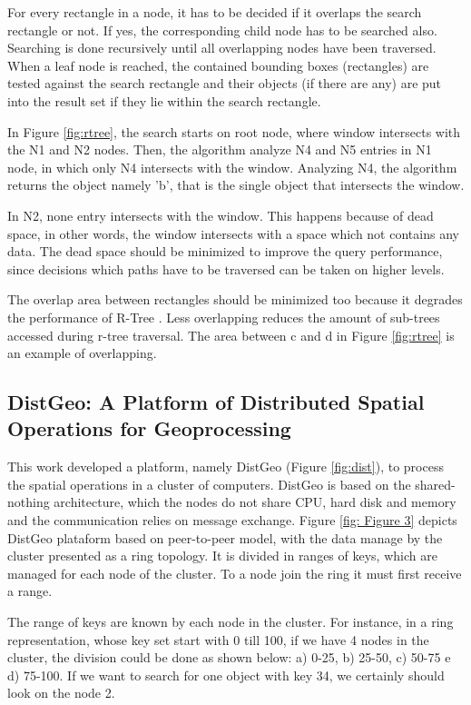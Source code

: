 For every rectangle in a node, it has to be decided if it overlaps the search rectangle or not. If yes, the corresponding child node has to be searched also. 
Searching is done recursively until all overlapping nodes have been traversed. When a leaf node is reached, the contained bounding boxes (rectangles) are tested against the search rectangle 
and their objects (if there are any) are put into the result set if they lie within the search rectangle.

In Figure \ref{fig:rtree}, the search starts on root node, where window intersects with the N1 and N2 nodes. Then, the algorithm analyze N4 and N5 entries in N1 node, in which only N4 intersects with the window. 
Analyzing N4, the algorithm returns the object namely 'b', that is the single object that intersects the window.

In N2, none entry intersects with the window. This happens because of dead space, in other words, the window intersects with a space which not contains any data. 
The dead space should be minimized to improve the query performance, since decisions which paths have to be traversed can be taken on higher levels. 

The overlap area between rectangles should be minimized too because it degrades the performance of R-Tree \cite{beckmann1990r}. 
Less overlapping reduces the amount of sub-trees accessed during r-tree traversal. The area between c and d in Figure \ref{fig:rtree} is an example of overlapping.

\subsection{DistGeo: A Platform of Distributed Spatial Operations for Geoprocessing}

This work developed a platform, namely DistGeo (Figure \ref{fig:dist}), to process the spatial operations in a cluster of computers. 
DistGeo is based on the shared-nothing architecture, which the nodes do not share CPU, hard disk and memory and the communication relies on message exchange. 
Figure \ref{fig: Figure 3} depicts DistGeo plataform based on peer-to-peer model, with the data manage by the cluster presented as a ring topology. 
It is divided in ranges of keys, which are managed for each node of the cluster. To a node join the ring it must first receive a range.

The range of keys are known by each node in the cluster. For instance, in a ring representation, whose key set start with 0 till 100, if we have 4 nodes in the cluster, the division could be done as shown below: 
a) 0-25, b) 25-50, c) 50-75 e d) 75-100. If we want to search for one object with key 34, we certainly should look on the node 2.

